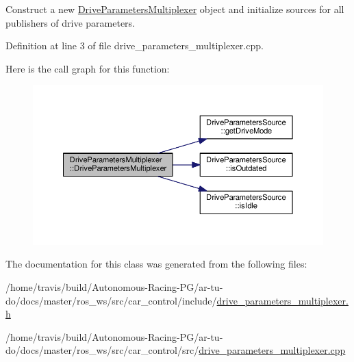 Construct a new \hyperlink{class_drive_parameters_multiplexer}{Drive\+Parameters\+Multiplexer} object and initialize sources for all publishers of drive parameters. 



Definition at line 3 of file drive\+\_\+parameters\+\_\+multiplexer.\+cpp.



Here is the call graph for this function\+:
\nopagebreak
\begin{figure}[H]
\begin{center}
\leavevmode
\includegraphics[width=350pt]{class_drive_parameters_multiplexer_a00fd5b0e6d1d76fce05212c78310bebc_cgraph}
\end{center}
\end{figure}




The documentation for this class was generated from the following files\+:\begin{DoxyCompactItemize}
\item 
/home/travis/build/\+Autonomous-\/\+Racing-\/\+P\+G/ar-\/tu-\/do/docs/master/ros\+\_\+ws/src/car\+\_\+control/include/\hyperlink{drive__parameters__multiplexer_8h}{drive\+\_\+parameters\+\_\+multiplexer.\+h}\item 
/home/travis/build/\+Autonomous-\/\+Racing-\/\+P\+G/ar-\/tu-\/do/docs/master/ros\+\_\+ws/src/car\+\_\+control/src/\hyperlink{drive__parameters__multiplexer_8cpp}{drive\+\_\+parameters\+\_\+multiplexer.\+cpp}\end{DoxyCompactItemize}
